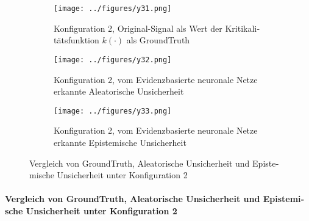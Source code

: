 \begin{otherlanguage}{ngerman}
\begin{figure}[!ht]
  \centering

  \begin{subfigure}[t]{\textwidth}
    \centering
    \texttt{[image: ../figures/y31.png]}
    \caption{Konfiguration 2, Original-Signal als Wert der Kritikalitätsfunktion \(k(\cdot)\) als \gls{GroundTruth}}
    \label{fig:bild31}
  \end{subfigure}

  \vspace{0.5em}

  \begin{subfigure}[t]{\textwidth}
    \centering
    \texttt{[image: ../figures/y32.png]}
    \caption{Konfiguration 2, vom \gls{Evidenzbasierte neuronale Netze} erkannte \gls{Aleatorische Unsicherheit}}
    \label{fig:bild32}
  \end{subfigure}

  \vspace{0.5em}

  \begin{subfigure}[t]{\textwidth}
    \centering
    \texttt{[image: ../figures/y33.png]}
    \caption{Konfiguration 2, vom \gls{Evidenzbasierte neuronale Netze} erkannte \gls{Epistemische Unsicherheit}}
    \label{fig:bild33}
  \end{subfigure}

  \caption{Vergleich von \gls{GroundTruth}, \gls{Aleatorische Unsicherheit} und \gls{Epistemische Unsicherheit} unter Konfiguration 2}
  \label{fig:three_subfigures2}
\end{figure}

\paragraph{Vergleich von \gls{GroundTruth}, \gls{Aleatorische Unsicherheit} und \gls{Epistemische Unsicherheit} unter Konfiguration 2} 




\end{otherlanguage}
